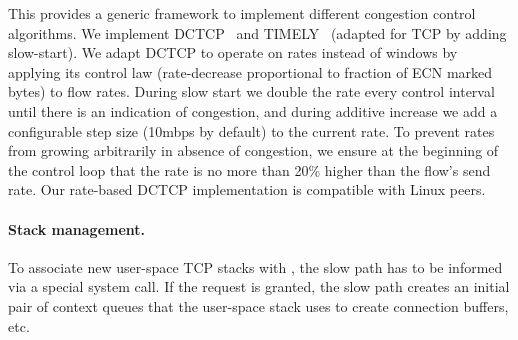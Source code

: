 This provides a generic framework to implement different congestion
control algorithms.  We implement DCTCP~\cite{dctcp} and
TIMELY~\cite{timely} (adapted for TCP by adding slow-start).  We adapt
DCTCP to operate on rates instead of windows by applying its control
law (rate-decrease proportional to fraction of ECN marked bytes) to
flow rates.  During slow start we double the rate every control
interval until there is an indication of congestion, and during
additive increase we add a configurable step size (10mbps by default)
to the current rate.  To prevent rates from growing arbitrarily in
absence of congestion, we ensure at the beginning of the control loop
that the rate is no more than 20\% higher than the flow's send rate.
Our rate-based DCTCP implementation is compatible with Linux peers.


\paragraph{Stack management.} To associate new user-space TCP stacks
with \softtcp, the slow path has to be informed via a special system
call. If the request is granted, the slow path creates an initial pair
of context queues that the user-space stack uses to create connection
buffers, etc.

